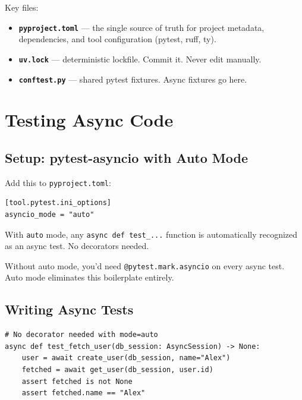 \documentclass[11pt,a4paper,oneside]{book}
\newcommand{\py}[1]{\texttt{\color{pyblue}#1}}
\begin{document}
\begin{infobox}
Key files:
\begin{itemize}
    \item \textbf{\texttt{pyproject.toml}} --- the single source of truth for project metadata,
          dependencies, and tool configuration (pytest, ruff, ty).
    \item \textbf{\texttt{uv.lock}} --- deterministic lockfile. Commit it. Never edit manually.
    \item \textbf{\texttt{conftest.py}} --- shared pytest fixtures. Async fixtures go here.
\end{itemize}
\end{infobox}

\chapter{Testing Async Code}

\section{Setup: pytest-asyncio with Auto Mode}

Add this to \texttt{pyproject.toml}:

\begin{lstlisting}[style=toml]
[tool.pytest.ini_options]
asyncio_mode = "auto"
\end{lstlisting}

With \py{auto} mode, any \py{async def test\_...} function is automatically recognized as
an async test. No decorators needed.

\begin{migrationbox}
Without auto mode, you'd need \py{@pytest.mark.asyncio} on every async test. Auto mode
eliminates this boilerplate entirely.
\end{migrationbox}

\section{Writing Async Tests}

\begin{lstlisting}[style=python]
# No decorator needed with mode=auto
async def test_fetch_user(db_session: AsyncSession) -> None:
    user = await create_user(db_session, name="Alex")
    fetched = await get_user(db_session, user.id)
    assert fetched is not None
    assert fetched.name == "Alex"
\end{lstlisting}
\end{document}
